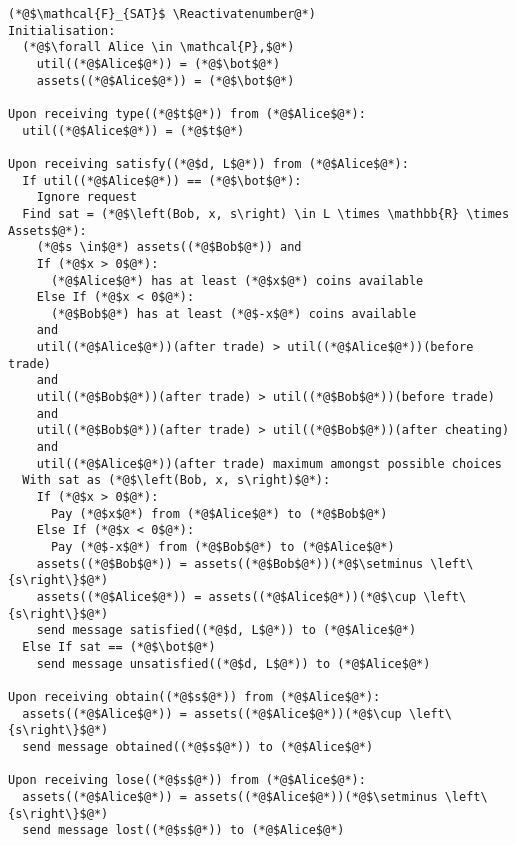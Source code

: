 \Suppressnumber
\begin{lstlisting}[label=satfunc, style=numbers]
(*@$\mathcal{F}_{SAT}$ \Reactivatenumber@*)
Initialisation:
  (*@$\forall Alice \in \mathcal{P},$@*)
    util((*@$Alice$@*)) = (*@$\bot$@*)
    assets((*@$Alice$@*)) = (*@$\bot$@*)

Upon receiving type((*@$t$@*)) from (*@$Alice$@*):
  util((*@$Alice$@*)) = (*@$t$@*)

Upon receiving satisfy((*@$d, L$@*)) from (*@$Alice$@*):
  If util((*@$Alice$@*)) == (*@$\bot$@*):
    Ignore request
  Find sat = (*@$\left(Bob, x, s\right) \in L \times \mathbb{R} \times Assets$@*):
    (*@$s \in$@*) assets((*@$Bob$@*)) and
    If (*@$x > 0$@*):
      (*@$Alice$@*) has at least (*@$x$@*) coins available
    Else If (*@$x < 0$@*):
      (*@$Bob$@*) has at least (*@$-x$@*) coins available
    and
    util((*@$Alice$@*))(after trade) > util((*@$Alice$@*))(before trade)
    and
    util((*@$Bob$@*))(after trade) > util((*@$Bob$@*))(before trade)
    and
    util((*@$Bob$@*))(after trade) > util((*@$Bob$@*))(after cheating)
    and
    util((*@$Alice$@*))(after trade) maximum amongst possible choices
  With sat as (*@$\left(Bob, x, s\right)$@*):
    If (*@$x > 0$@*):
      Pay (*@$x$@*) from (*@$Alice$@*) to (*@$Bob$@*)
    Else If (*@$x < 0$@*):
      Pay (*@$-x$@*) from (*@$Bob$@*) to (*@$Alice$@*)
    assets((*@$Bob$@*)) = assets((*@$Bob$@*))(*@$\setminus \left\{s\right\}$@*)
    assets((*@$Alice$@*)) = assets((*@$Alice$@*))(*@$\cup \left\{s\right\}$@*)
    send message satisfied((*@$d, L$@*)) to (*@$Alice$@*)
  Else If sat == (*@$\bot$@*)
    send message unsatisfied((*@$d, L$@*)) to (*@$Alice$@*)

Upon receiving obtain((*@$s$@*)) from (*@$Alice$@*):
  assets((*@$Alice$@*)) = assets((*@$Alice$@*))(*@$\cup \left\{s\right\}$@*)
  send message obtained((*@$s$@*)) to (*@$Alice$@*)

Upon receiving lose((*@$s$@*)) from (*@$Alice$@*):
  assets((*@$Alice$@*)) = assets((*@$Alice$@*))(*@$\setminus \left\{s\right\}$@*)
  send message lost((*@$s$@*)) to (*@$Alice$@*)
\end{lstlisting}
